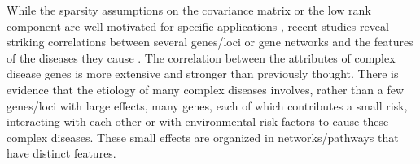 \documentclass[11pt,oneside]{amsart}
\begin{document}
While the sparsity assumptions on the covariance matrix or the low rank component are well motivated for specific applications \citep{zou2006sparse, shen2008sparse, witten2009penalized,bhattacharya2011sparse}, recent studies reveal striking correlations between several genes/loci or gene networks and the features of the diseases they cause \citep{jimenez2001human, ideker2008protein}. The correlation between the attributes of complex disease genes is more extensive and stronger than previously thought. There is evidence that the etiology of many complex diseases involves, rather than a few genes/loci with large effects, many genes, each of which contributes a small risk, interacting with each other or with environmental risk factors to cause these complex diseases. These small effects are organized in networks/pathways that have distinct features. 


\end{document}
